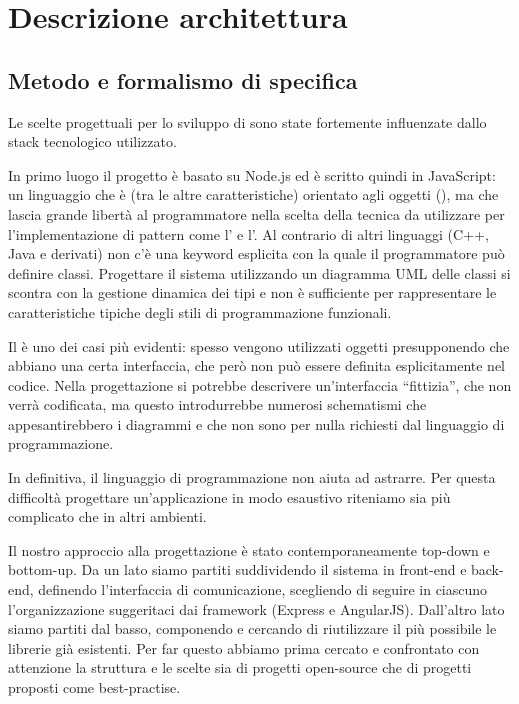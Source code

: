 \section{Descrizione architettura}

\subsection{Metodo e formalismo di specifica}

Le scelte progettuali per lo sviluppo di \ProjectName{} sono state fortemente influenzate dallo stack tecnologico utilizzato.

In primo luogo il progetto è basato su Node.js ed è scritto quindi in JavaScript: un linguaggio che è (tra le altre caratteristiche) orientato agli oggetti (), ma che lascia grande libertà al programmatore nella scelta della tecnica da utilizzare per l'implementazione di pattern come l' e l'. Al contrario di altri linguaggi (C++, Java e derivati) non c'è una keyword esplicita con la quale il programmatore può definire classi. Progettare il sistema utilizzando un diagramma UML delle classi si scontra con la gestione dinamica dei tipi e non è sufficiente per rappresentare le caratteristiche tipiche degli stili di programmazione funzionali.

Il  è uno dei casi più evidenti: spesso vengono utilizzati oggetti presupponendo che abbiano una certa interfaccia, che però non può essere definita esplicitamente nel codice. Nella progettazione si potrebbe descrivere un'interfaccia ``fittizia'', che non verrà codificata, ma questo introdurrebbe numerosi schematismi che appesantirebbero i diagrammi e che non sono per nulla richiesti dal linguaggio di programmazione.

In definitiva, il linguaggio di programmazione non aiuta ad astrarre. Per questa difficoltà progettare un'applicazione in modo esaustivo riteniamo sia più complicato che in altri ambienti.

Il nostro approccio alla progettazione è stato contemporaneamente top-down e bottom-up. Da un lato siamo partiti suddividendo il sistema in front-end e back-end, definendo l'interfaccia di comunicazione, scegliendo di seguire in ciascuno l'organizzazione suggeritaci dai framework (Express e AngularJS). Dall'altro lato siamo partiti dal basso, componendo e cercando di riutilizzare il più possibile le librerie già esistenti. Per far questo abbiamo prima cercato e confrontato con attenzione la struttura e le scelte sia di progetti open-source che di progetti proposti come best-practise.

